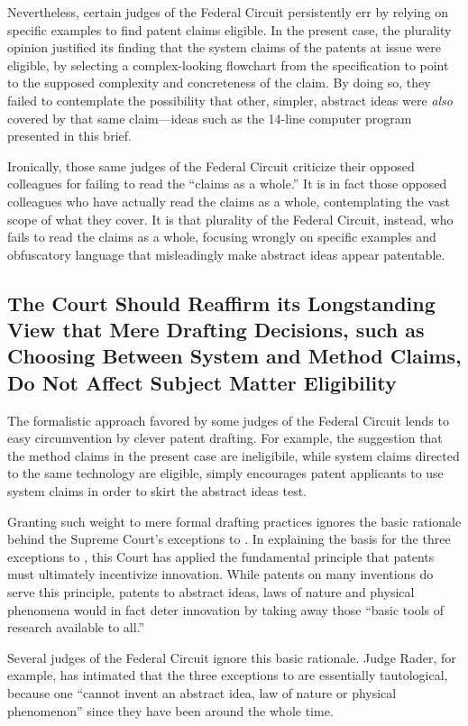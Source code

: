 \documentclass{scotus}
\begin{document}
Nevertheless, certain judges of the Federal Circuit persistently err by relying
on specific examples to find patent claims eligible. In the present case, the
plurality opinion justified its finding that the system claims of the patents at
issue were eligible, by selecting a complex-looking flowchart from the
specification to point to the supposed complexity and concreteness of the claim.
By doing so, they failed to contemplate the possibility that other, simpler,
abstract ideas were \emph{also} covered by that same claim---ideas such as the
14-line computer program presented in this brief.

Ironically, those same judges of the Federal Circuit criticize their opposed
colleagues for failing to read the ``claims as a whole.'' It is in fact those
opposed colleagues who have actually read the claims as a whole, contemplating
the vast scope of what they cover. It is that plurality of the Federal Circuit,
instead, who fails to read the claims as a whole, focusing wrongly on specific
examples and obfuscatory language that misleadingly make abstract ideas appear
patentable.

\subsection{The Court Should Reaffirm its Longstanding View that Mere Drafting
Decisions, such as Choosing Between System and Method Claims, Do Not Affect
Subject Matter Eligibility}

The formalistic approach favored by some judges of the Federal Circuit lends to
easy circumvention by clever patent drafting. For example, the suggestion that
the method claims in the present case are ineligibile, while system claims
directed to the same technology are eligible, simply encourages patent
applicants to use system claims in order to skirt the abstract ideas test.

Granting such weight to mere formal drafting practices ignores the basic
rationale behind the Supreme Court's exceptions to . In explaining
the basis for the three exceptions to , this Court has applied the
fundamental principle that patents must ultimately incentivize innovation. While
patents on many inventions do serve this principle, patents to abstract ideas,
laws of nature and physical phenomena would in fact deter innovation by taking
away those ``basic tools of research available to all.''

Several judges of the Federal Circuit ignore this basic rationale. Judge Rader,
for example, has intimated that the three exceptions to  are
essentially tautological, because one ``cannot invent an abstract idea, law of
nature or physical phenomenon'' since they have been around the whole time.
\end{document}
